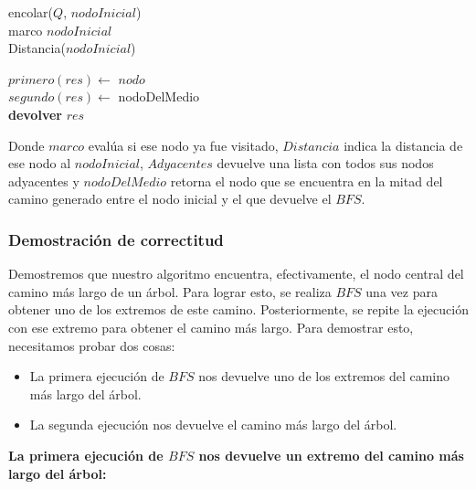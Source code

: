 \begin{itemize}
\begin{algorithm}[H]
    encolar($Q$, $nodoInicial$)\\
    marco $nodoInicial$\\
    Distancia($nodoInicial$) \\
    
    $primero(res) \leftarrow$ $nodo$\\
    $segundo(res) \leftarrow$ nodoDelMedio\\
    
	\textbf{devolver} $res$
\end{algorithm}

Donde $marco$ evalúa si ese nodo ya fue visitado, $Distancia$ indica la distancia de ese nodo al $nodoInicial$, $Adyacentes$ devuelve una lista con todos sus nodos adyacentes y $nodoDelMedio$ retorna el nodo que se encuentra en la mitad del camino generado entre el nodo inicial y el que devuelve el $BFS$.

\subsubsection{Demostración de correctitud}
Demostremos que nuestro algoritmo encuentra, efectivamente, el nodo central del camino más largo de un árbol. Para lograr esto, se realiza $BFS$ una vez para obtener uno de los extremos de este camino. Posteriormente, se repite la ejecución con ese extremo para obtener el camino más largo.\newline
Para demostrar esto, necesitamos probar dos cosas: 
\begin {itemize}
\item La primera ejecución de $BFS$ nos devuelve uno de los extremos del camino más largo del árbol.
\item La segunda ejecución nos devuelve el camino más largo del árbol.
\end{itemize}
\newline
\textbf{La primera ejecución de $BFS$ nos devuelve un extremo del camino más largo del árbol:} \newline


\end{itemize}
